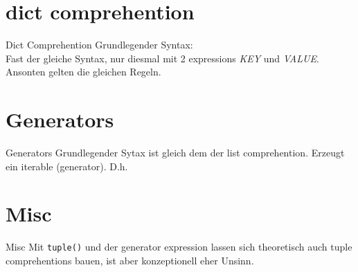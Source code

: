 \section{dict comprehention}
\begin{frame}{Dict Comprehention}
  Grundlegender Syntax: \\
  Fast der gleiche Syntax, nur diesmal mit 2 expressions \textit{KEY} und \textit{VALUE}. Ansonten gelten die gleichen Regeln.
\end{frame}


\section{Generators}
\begin{frame}{Generators}
  Grundlegender Sytax ist gleich dem der list comprehention. Erzeugt ein iterable (generator). D.h. 
\end{frame}


\section{Misc}
\begin{frame}{Misc}
  Mit \texttt{tuple()} und der generator expression lassen sich theoretisch auch tuple comprehentions bauen, ist aber konzeptionell eher Unsinn.
\end{frame}



